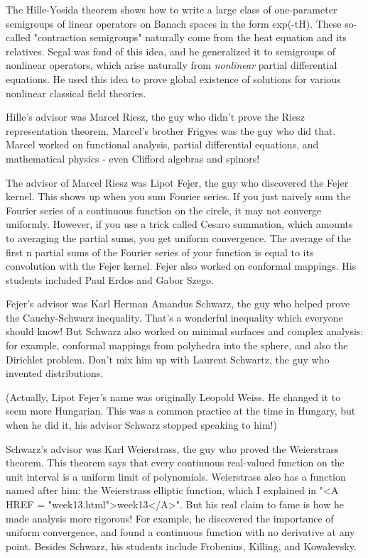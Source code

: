 The Hille-Yosida theorem shows how to write a large class of
one-parameter semigroups of linear operators on Banach spaces in the
form exp(-tH).  These so-called "contraction semigroups" naturally
come from the heat equation and its relatives.  Segal was fond of this
idea, and he generalized it to semigroups of nonlinear operators,
which arise naturally from \emph{nonlinear} partial differential equations.
He used this idea to prove global existence of solutions for various
nonlinear classical field theories.

Hille's advisor was Marcel Riesz, the guy who didn't prove the Riesz
representation theorem.  Marcel's brother Frigyes was the guy who did
that.  Marcel worked on functional analysis, partial differential
equations, and mathematical physics - even Clifford algebras and
spinors!  

The advisor of Marcel Riesz was Lipot Fejer, the guy who discovered
the Fejer kernel.  This shows up when you sum Fourier series.  If you
just naively sum the Fourier series of a continuous function on the
circle, it may not converge uniformly.  However, if you use a trick
called Cesaro summation, which amounts to averaging the partial sums,
you get uniform convergence.  The average of the first n partial sums
of the Fourier series of your function is equal to its convolution
with the Fejer kernel.  Fejer also worked on conformal mappings.  His
students included Paul Erdos and Gabor Szego.

Fejer's advisor was Karl Herman Amandus Schwarz, the guy who helped
prove the Cauchy-Schwarz inequality.  That's a wonderful inequality
which everyone should know!  But Schwarz also worked on minimal
surfaces and complex analysis: for example, conformal mappings from
polyhedra into the sphere, and also the Dirichlet problem.  Don't mix
him up with Laurent Schwartz, the guy who invented distributions.

(Actually, Lipot Fejer's name was originally Leopold Weiss.  He changed
it to seem more Hungarian.  This was a common practice at the time in 
Hungary, but when he did it, his advisor Schwarz stopped speaking to him!)

Schwarz's advisor was Karl Weierstrass, the guy who proved the Weierstrass 
theorem.  This theorem says that every continuous real-valued function
on the unit interval is a uniform limit of polynomials.  Weierstrass
also has a function named after him: the Weierstrass elliptic function,
which I explained in "<A HREF = "week13.html">week13</A>".  But his real claim to fame is how he
made analysis more rigorous!  For example, he discovered the importance
of uniform convergence, and found a continuous function with no derivative 
at any point.   Besides Schwarz, his students include Frobenius, Killing,
and Kowalevsky.

